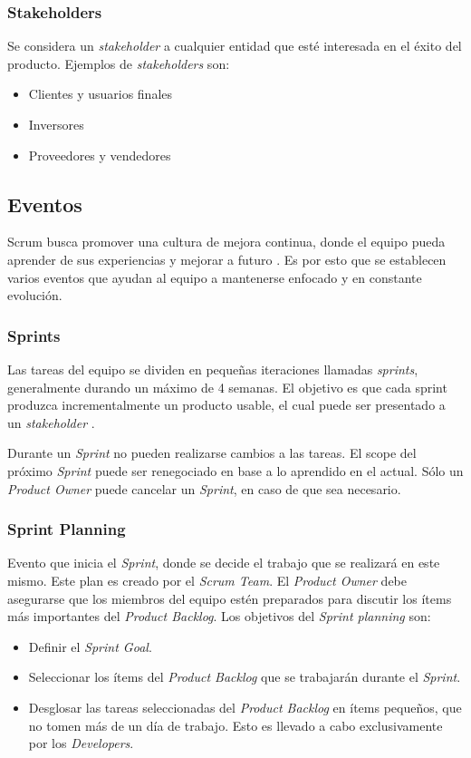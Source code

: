 \subsubsection{Stakeholders}
\par Se considera un \emph{stakeholder} a cualquier entidad que esté interesada en el éxito del producto. Ejemplos de \emph{stakeholders} son:
\begin{itemize}
  \item Clientes y usuarios finales
  \item Inversores
  \item Proveedores y vendedores
\end{itemize}
%
%
\subsection{Eventos}
\par Scrum busca promover una cultura de mejora continua, donde el equipo pueda aprender de sus experiencias y mejorar a futuro \cite{excelgchukwurahELEVATINGTEAMPERFORMANCE2024}. Es por esto que se establecen varios eventos que ayudan al equipo a mantenerse enfocado y en constante evolución.
%
\subsubsection{Sprints}
\label{sec:sprint}
\par Las tareas del equipo se dividen en pequeñas iteraciones llamadas \emph{sprints}, generalmente durando un máximo de 4 semanas. El objetivo es que cada sprint produzca incrementalmente un producto usable, el cual puede ser presentado a un \emph{stakeholder} \cite{bartoszScrumVideoGames2023}.
\par Durante un \emph{Sprint} no pueden realizarse cambios a las tareas. El scope del próximo \emph{Sprint} puede ser renegociado en base a lo aprendido en el actual. Sólo un \emph{Product Owner} puede cancelar un \emph{Sprint}, en caso de que sea necesario.
%
\subsubsection{Sprint Planning}
\par Evento que inicia el \emph{Sprint}, donde se decide el trabajo que se realizará en este mismo. Este plan es creado por el \emph{Scrum Team}. El \emph{Product Owner} debe asegurarse que los miembros del equipo estén preparados para discutir los ítems más importantes del \emph{Product Backlog}. Los objetivos del \emph{Sprint planning} son:
\begin{itemize}
  \item Definir el \emph{Sprint Goal}.
  \item Seleccionar los ítems del \emph{Product Backlog} que se trabajarán durante el \emph{Sprint}.
  \item Desglosar las tareas seleccionadas del \emph{Product Backlog} en ítems pequeños, que no tomen más de un día de trabajo. Esto es llevado a cabo exclusivamente por los \emph{Developers}.
\end{itemize}
%
